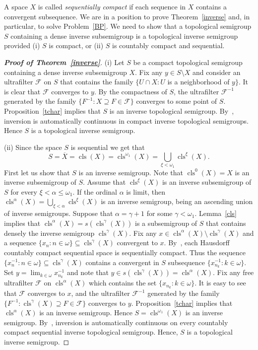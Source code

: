 \documentclass[12pt, twoside, leqno]{article}
\theoremstyle{definition}
\numberwithin{equation}{section}
\newcommand{\F}{\mathcal F}
\newcommand{\w}{\omega}
\newcommand{\cls}{\operatorname{cls}}
\begin{document}
A space $X$ is called {\em sequentially compact} if each sequence in $X$ contains a convergent subsequence.
We are in a position to prove Theorem~\ref{inverse} and, in particular, to solve Problem~\ref{BP}. We need to show that a topological semigroup $S$ containing a dense inverse subsemigroup is a topological inverse semigroup provided (i) $S$ is compact, or (ii) $S$ is countably compact and sequential.


\begin{proof}[{\bf Proof of Theorem~\ref{inverse}}]
(i) Let $S$ be a compact topological semigroup containing a dense inverse subsemigroup $X$. 
Fix any $y\in S\setminus X$ and consider an ultrafilter $\F$ on $S$ that contains the family $\{U\cap X: U$ is a neighborhood of $y\}$. It is clear that $\F$ converges to $y$. By the compactness of $S$, the ultrafilter $\F^{-1}$ generated by the family $\{F^{-1}:X\supseteq F\in\F\}$ converges to some point of $S$. Proposition~\ref{tchar} implies that $S$ is an inverse topological semigroup. By~\cite[Proposition 1.6.7]{Hajii}, inversion is automatically continuous in compact inverse topological semigroups. Hence $S$ is a topological inverse semigroup.


(ii) Since the space $S$ is sequential we get that $$S=\overline{X}=\cls(X)=\cls^{\w_1}(X)=\bigcup_{\xi<\w_1}\cls^{\xi}(X).$$ First let us show that $S$ is an inverse semigroup. Note that $\cls^0(X)=X$ is an inverse subsemigroup of $S$.
Assume that $\cls^{\xi}(X)$ is an inverse subsemigroup of $S$ for every $\xi<\alpha\leq \w_1$. If the ordinal $\alpha$ is limit, then 
$\cls^{\alpha}(X)=\bigcup_{\xi<\alpha}\cls^\xi(X)$ is an inverse semigroup, being an ascending union of inverse semigroups. 
Suppose that $\alpha=\gamma+1$ for some $\gamma<\omega_1$. Lemma~\ref{cls} implies that $\cls^{\alpha}(X)=s(\cls^{\gamma}(X))$ is a subsemigroup of $S$ that contains densely the inverse semigroup $\cls^{\gamma}(X)$.
Fix any $x\in \cls^{\alpha}(X)\setminus \cls^{\gamma}(X)$ and a sequence $\{x_n:n\in\w\}\subseteq \cls^{\gamma}(X)$ convergent to $x$. 
By~\cite[Theorem 3.10.31]{Eng}, each Hausdorff countably compact sequential space is sequentially compact. Thus the sequence $\{x_n^{-1}: n\in\w\}\subseteq \cls^{\gamma}(X)$ contains a convergent in $S$ subsequence $\{x^{-1}_{n_k}: k\in\w\}$. Set $y=\lim_{k\in\w}x^{-1}_{n_k}$ and note that $y\in s(\cls^{\gamma}(X))=\cls^{\alpha}(X)$. Fix any free ultrafilter $\F$ on $\cls^{\alpha}(X)$ which contains the set $\{x_{n_k}:k\in\w\}$.  It is easy to see that $\F$ converges to $x$, and the ultrafilter $\F^{-1}$ generated by the family $\{F^{-1}\colon \cls^{\gamma}(X)\supseteq F\in\F\}$ converges to $y$. Proposition~\ref{tchar} implies that $\cls^{\alpha}(X)$ is an inverse semigroup. Hence $S=\cls^{\w_1}(X)$ is an inverse semigroup. 
By~\cite[Corollary 1]{BG}, inversion is automatically continuous on every countably compact sequential inverse topological semigroup.
Hence, $S$ is a topological inverse semigroup.
\end{proof}
\end{document}
